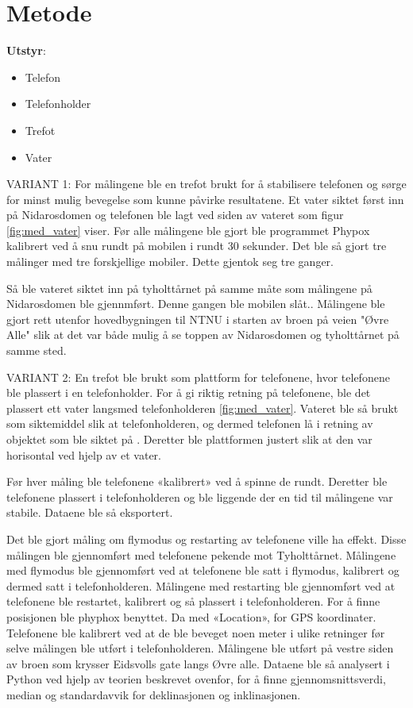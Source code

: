 \section{Metode}
\noindent\textbf{Utstyr}:
\begin{itemize}
    \item Telefon
    \item Telefonholder
    \item Trefot
    \item Vater
\end{itemize}
VARIANT 1:
For målingene ble en trefot brukt for å stabilisere telefonen og sørge for minst mulig bevegelse som kunne påvirke resultatene. Et vater siktet først inn på Nidarosdomen og telefonen ble lagt ved siden av vateret som figur \ref{fig:med_vater} viser. Før alle målingene ble gjort ble programmet Phypox kalibrert ved å snu rundt på mobilen i rundt 30 sekunder. Det ble så gjort tre målinger med tre forskjellige mobiler. Dette gjentok seg tre ganger.

Så ble vateret siktet inn på tyholttårnet på samme måte som målingene på Nidarosdomen ble gjennmført. Denne gangen ble mobilen slåt..
Målingene ble gjort rett utenfor hovedbygningen til NTNU i starten av broen på veien "Øvre Alle" slik at det var både mulig å se toppen av Nidarosdomen og tyholttårnet på samme sted.  \newline


VARIANT 2:
En trefot ble brukt som plattform for telefonene, hvor telefonene ble plassert i en telefonholder. For å gi riktig retning på telefonene, ble det plassert ett vater langsmed telefonholderen \ref{fig:med_vater}. Vateret ble så brukt som siktemiddel slik at telefonholderen, og dermed telefonen lå i retning av objektet som ble siktet på . Deretter ble plattformen justert slik at den var horisontal ved hjelp av et vater.

Før hver måling ble telefonene «kalibrert» ved å spinne de rundt. Deretter ble telefonene plassert i telefonholderen og ble liggende der en tid til målingene var stabile. Dataene ble så eksportert. 

Det ble gjort måling om flymodus og restarting av telefonene ville ha effekt. Disse målingen ble gjennomført med telefonene pekende mot Tyholttårnet. Målingene med flymodus ble gjennomført ved at telefonene ble satt i flymodus, kalibrert og dermed satt i telefonholderen. Målingene med restarting ble gjennomført ved at telefonene ble restartet, kalibrert og så plassert i telefonholderen.
For å finne posisjonen ble phyphox benyttet. Da med «Location», for GPS koordinater. Telefonene ble kalibrert ved at de ble beveget noen meter i ulike retninger før selve målingen ble utført i telefonholderen. Målingene ble utført på vestre siden av broen som krysser Eidsvolls gate langs Øvre alle. 
Dataene ble så analysert i Python ved hjelp av teorien beskrevet ovenfor, for å finne gjennomsnittsverdi, median og standardavvik for deklinasjonen og inklinasjonen.   

